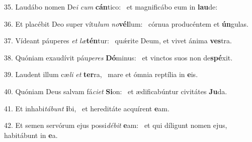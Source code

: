 35. Laudábo nomen De\textit{i} \textit{cum} \textbf{cán}tico: \ast\  et magnificábo eum in \textbf{lau}de:\

36. Et placébit Deo super vítu\textit{lum} \textit{no}\textbf{vél}lum: \ast\  córnua producéntem et \textbf{ún}gulas.\

37. Vídeant páuperes \textit{et} \textit{læ}\textbf{tén}tur: \ast\  quǽrite Deum, et vivet ánima \textbf{ves}tra.\

38. Quóniam exaudívit páu\textit{pe}\textit{res} \textbf{Dó}minus: \ast\  et vinctos suos non de\textbf{spé}xit.\

39. Laudent illum cæ\textit{li} \textit{et} \textbf{ter}ra, \ast\  mare et ómnia reptília in \textbf{e}is.\

40. Quóniam Deus salvam fá\textit{ci}\textit{et} \textbf{Si}on: \ast\  et ædificabúntur civitátes \textbf{Ju}da.\

41. Et inhabi\textit{tá}\textit{bunt} \textbf{i}bi, \ast\  et hereditáte acquírent \textbf{e}am.\

42. Et semen servórum ejus possi\textit{dé}\textit{bit} \textbf{e}am: \ast\  et qui díligunt nomen ejus, habitábunt in \textbf{e}a.\

